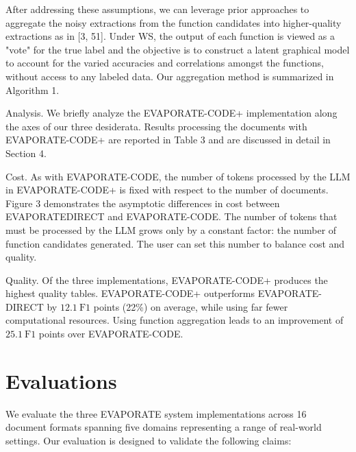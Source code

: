 \documentclass[10pt]{article}
\begin{document}
After addressing these assumptions, we can leverage prior approaches to aggregate the noisy extractions from the function candidates into higher-quality extractions as in [3, 51]. Under WS, the output of each function is viewed as a "vote" for the true label and the objective is to construct a latent graphical model to account for the varied accuracies and correlations amongst the functions, without access to any labeled data. Our aggregation method is summarized in Algorithm 1.

Analysis. We briefly analyze the EVAPORATE-CODE+ implementation along the axes of our three desiderata. Results processing the documents with EVAPORATE-CODE+ are reported in Table 3 and are discussed in detail in Section 4.

Cost. As with EVAPORATE-CODE, the number of tokens processed by the LLM in EVAPORATE-CODE+ is fixed with respect to the number of documents. Figure 3 demonstrates the asymptotic differences in cost between EVAPORATEDIRECT and EVAPORATE-CODE. The number of tokens that must be processed by the LLM grows only by a constant factor: the number of function candidates generated. The user can set this number to balance cost and quality.

Quality. Of the three implementations, EVAPORATE-CODE+ produces the highest quality tables. EVAPORATE-CODE+ outperforms EVAPORATE-DIRECT by $12.1 \mathrm{~F} 1$ points (22\%) on average, while using far fewer computational resources. Using function aggregation leads to an improvement of $25.1 \mathrm{~F} 1$ points over EVAPORATE-CODE.

\section{Evaluations}
We evaluate the three EVAPORATE system implementations across 16 document formats spanning five domains representing a range of real-world settings. Our evaluation is designed to validate the following claims:
\end{document}
